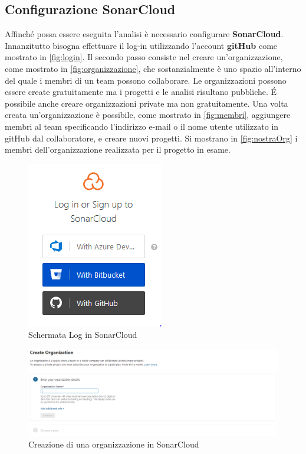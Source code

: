 \subsection{Configurazione SonarCloud}
Affinché possa essere eseguita l'analisi è necessario configurare \textbf{SonarCloud}. Innanzitutto bisogna effettuare il log-in utilizzando l'account \textbf{gitHub} come mostrato in \autoref{fig:login}. Il secondo passo consiste nel creare un'organizzazione, come mostrato in \autoref{fig:organizzazione}, che sostanzialmente è uno spazio all'interno del quale i membri di un team possono collaborare. Le organizzazioni possono essere create gratuitamente ma i progetti e le analisi risultano pubbliche. \'E possibile anche creare organizzazioni private ma non gratuitamente. Una volta creata un'organizzazione è possibile, come mostrato in \autoref{fig:membri}, aggiungere membri al team specificando l'indirizzo e-mail o il nome utente utilizzato in gitHub dal collaboratore, e creare nuovi progetti. Si mostrano in \autoref{fig:nostraOrg} i membri dell'organizzazione realizzata per il progetto in esame.
\begin{figure}[htbp]
	\centering
	\includegraphics[scale=1, trim = 0cm 0cm 0cm 0cm, clip=true]{figSonarCloud/figLogInSonar.PNG}
	\caption{Schermata Log in SonarCloud}
	\label{fig:login}
\end{figure}

\begin{figure}[htbp]
	\centering
	\includegraphics[scale=0.3, trim = 0cm 0cm 0cm 0cm, clip=true]{figSonarCloud/organizzazione.PNG}
	\caption{Creazione di una organizzazione in SonarCloud}
	\label{fig:organizzazione}
\end{figure}

